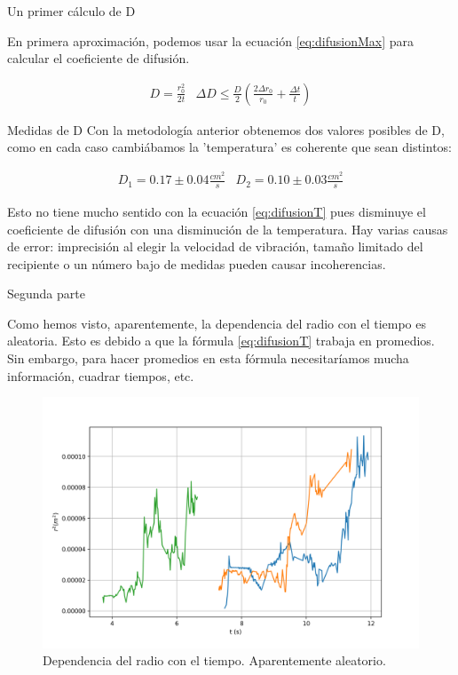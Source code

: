\documentclass{beamer}
\begin{document}
\begin{frame}{Un primer cálculo de D}

En primera aproximación, podemos usar la ecuación \ref{eq:difusionMax} para calcular el coeficiente de difusión.

$$
\begin{array}{cc}
D = \frac{r_0^2}{2t} & \Delta D \leq \frac{D}{2}\left(\frac{2\Delta r_0}{r_0} + \frac{\Delta t}{t} \right)
\end{array}
$$

\begin{block}{Medidas de D}
Con la metodología anterior obtenemos dos valores posibles de D, como en cada caso cambiábamos la 'temperatura' es coherente que sean distintos:

$$
\begin{array}{cc}
D_1 = 0.17 \pm 0.04 \frac{cm^2}{s} & D_2 = 0.10 \pm 0.03 \frac{cm^2}{s}
\end{array}
$$
\end{block}

Esto no tiene mucho sentido con la ecuación \ref{eq:difusionT} pues disminuye el coeficiente de difusión con una disminución de la temperatura. Hay varias causas de error: imprecisión al elegir la velocidad de vibración, tamaño limitado del recipiente o un número bajo de medidas pueden causar incoherencias.
\end{frame}

\begin{frame}{Segunda parte}

Como hemos visto, aparentemente, la dependencia del radio con el tiempo es aleatoria. Esto es debido a que la fórmula \ref{eq:difusionT} trabaja en promedios. Sin embargo, para hacer promedios en esta fórmula necesitaríamos mucha información, cuadrar tiempos, etc.

\begin{figure}[h!]
\begin{center}
\includegraphics[scale=0.3]{Radios.png}
\caption{Dependencia del radio con el tiempo. Aparentemente aleatorio.}
\end{center}
\end{figure}
\end{frame}
\end{document}
